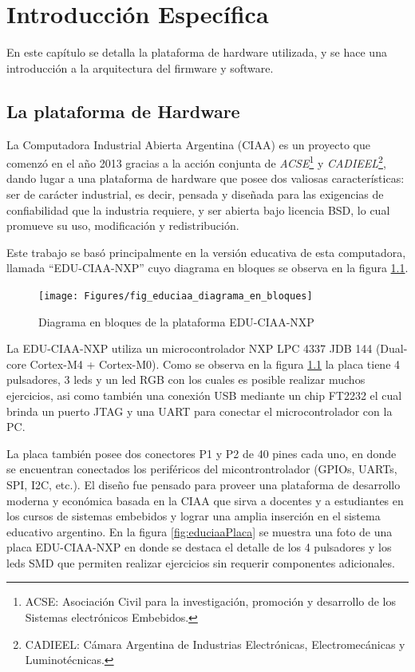 \chapter{Introducción Específica} %

\label{Chapter2}

En este capítulo se detalla la plataforma de hardware utilizada, y se hace una introducción a la arquitectura del firmware y software.
\section{La plataforma de Hardware}
\label{sec:plataforma}

La Computadora Industrial Abierta Argentina (CIAA) es un proyecto que comenzó en el año 2013 
gracias a la acción conjunta de \textit{ACSE}\footnote{ACSE: Asociación Civil para la investigación, promoción y desarrollo de los Sistemas electrónicos Embebidos.} y \textit{CADIEEL}\footnote{CADIEEL: Cámara Argentina de Industrias Electrónicas, Electromecánicas y Luminotécnicas.}, dando lugar a una plataforma de hardware que posee dos valiosas características: ser de carácter industrial, es decir, pensada y diseñada para las exigencias de confiabilidad que la industria requiere, y ser abierta bajo licencia BSD, lo cual promueve su uso, modificación y redistribución.

Este trabajo se basó principalmente en la versión educativa de esta computadora, llamada “EDU-CIAA-NXP” cuyo diagrama en bloques se observa en la figura \ref{fig:educiaaBloques}.

\begin{figure}[h]
  \centering
    \texttt{[image: Figures/fig\_educiaa\_diagrama\_en\_bloques]}
  \caption{Diagrama en bloques de la plataforma EDU-CIAA-NXP}
  \label{fig:educiaaBloques}
\end{figure}

La EDU-CIAA-NXP utiliza un microcontrolador NXP LPC 4337 JDB 144 (Dual-core Cortex-M4 + Cortex-M0). Como se observa en la figura \ref{fig:educiaaBloques} la placa tiene 4 pulsadores, 3 leds y un led RGB con los cuales es posible realizar muchos ejercicios, asi como también una conexión USB mediante un chip FT2232 el cual brinda un puerto JTAG y una UART para conectar el microcontrolador con la PC.

La placa también posee dos conectores P1 y P2 de 40 pines cada uno, en donde se encuentran conectados los periféricos del micontrontrolador (GPIOs, UARTs, SPI, I2C, etc.). El diseño fue pensado para proveer una plataforma de desarrollo moderna y económica basada en la CIAA que sirva a docentes y a estudiantes en los cursos de sistemas embebidos y lograr una amplia inserción en el sistema educativo argentino.
En la figura \ref{fig:educiaaPlaca} se muestra una foto de una placa EDU-CIAA-NXP en donde se destaca el detalle de los 4 pulsadores y los leds SMD que permiten realizar ejercicios sin requerir componentes adicionales.

